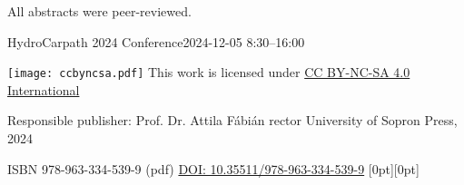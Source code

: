 \vspace*{\fill}
\noindent{}All abstracts were peer-reviewed.
\vspace*{10mm}

\footnotesize{}
\noindent{}HydroCarpath 2024 Conference\newline{}2024-12-05 8:30–16:00
\vspace*{5mm}

\noindent{}\texttt{[image: ccbyncsa.pdf]}\newline{}
This work is licensed under \href{https://creativecommons.org/licenses/by-nc-nd/4.0/deed.en}{CC BY-NC-SA 4.0 International}

\noindent{}Responsible publisher: Prof. Dr. Attila Fábián rector \newline{} University of Sopron Press, 2024

\noindent ISBN 978-963-334-539-9 (pdf)\newline{}
\noindent \href{https://doi.org/10.35511/978-963-334-539-9}{DOI: 10.35511/978-963-334-539-9}
\hspace*{\fill} \hspace{1mm} \raisebox{0mm}[0pt][0pt]{}
\normalsize{}

\setcounter{page}{2}
\cleardoublepage{}
\fancyhead[LE,RO]{\thepage}

\setcounter{secnumdepth}{0}%
{}
\tableofcontents{}
\newpage{}
{}


{}

\setcounter{articleid}{0}
{}


{}
\printindex
{}
{}

